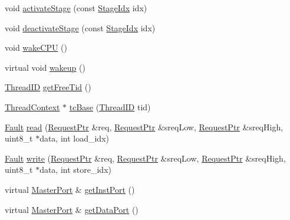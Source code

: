 \begin{DoxyCompactItemize}
\item 
void \hyperlink{classFullO3CPU_a631f1fd5f15efc2953529efa22868bcd}{activateStage} (const \hyperlink{classFullO3CPU_ad8ae6b222928fd7316fcf1f9f233353d}{StageIdx} idx)
\item 
void \hyperlink{classFullO3CPU_a9ebbaf1718ed44d77051269c9734f6ae}{deactivateStage} (const \hyperlink{classFullO3CPU_ad8ae6b222928fd7316fcf1f9f233353d}{StageIdx} idx)
\item 
void \hyperlink{classFullO3CPU_abce3a63b123f84972e4df7962f9b870e}{wakeCPU} ()
\item 
virtual void \hyperlink{classFullO3CPU_ae674290a26ecbd622c5160e38e8a4fe9}{wakeup} ()
\item 
\hyperlink{base_2types_8hh_ab39b1a4f9dad884694c7a74ed69e6a6b}{ThreadID} \hyperlink{classFullO3CPU_a64117a0245250fc5be941e729bedcc03}{getFreeTid} ()
\item 
\hyperlink{classThreadContext}{ThreadContext} $\ast$ \hyperlink{classFullO3CPU_acaae0f849591d618f1c202e5ed29b4e4}{tcBase} (\hyperlink{base_2types_8hh_ab39b1a4f9dad884694c7a74ed69e6a6b}{ThreadID} tid)
\item 
\hyperlink{classRefCountingPtr}{Fault} \hyperlink{classFullO3CPU_a0bdeb74163a7a4d65b7773897ef8eb09}{read} (\hyperlink{classRequest}{RequestPtr} \&req, \hyperlink{classRequest}{RequestPtr} \&sreqLow, \hyperlink{classRequest}{RequestPtr} \&sreqHigh, uint8\_\-t $\ast$data, int load\_\-idx)
\item 
\hyperlink{classRefCountingPtr}{Fault} \hyperlink{classFullO3CPU_a43e0f9eec34726914d8eb76f5d884cc8}{write} (\hyperlink{classRequest}{RequestPtr} \&req, \hyperlink{classRequest}{RequestPtr} \&sreqLow, \hyperlink{classRequest}{RequestPtr} \&sreqHigh, uint8\_\-t $\ast$data, int store\_\-idx)
\item 
virtual \hyperlink{classMasterPort}{MasterPort} \& \hyperlink{classFullO3CPU_a40da530cb5dd380fd7fc0d786e94d5eb}{getInstPort} ()
\item 
virtual \hyperlink{classMasterPort}{MasterPort} \& \hyperlink{classFullO3CPU_aeea6b55ae1c4be53c21dbee434b221d4}{getDataPort} ()
\end{DoxyCompactItemize}

